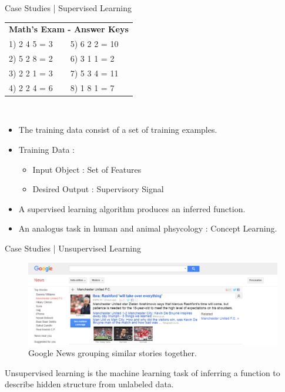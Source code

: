 \documentclass[10pt]{beamer}
\begin{document}
			\begin{frame}{Case Studies | Supervised Learning}
				\begin{center}
					\begin{tabular}{|l l|}\hline 
						\multicolumn{2}{|c|}{\textbf{Math's Exam - Answer Keys}}\\
						1) 2  4  5 = 3 & 5) 6  2  2 = 10 \\ 
						2) 5  2  8 = 2 & 6) 3  1  1 = 2  \\ 
						3) 2  2  1 = 3 & 7) 5  3  4 = 11 \\ 
						4) 2  2  4 = 6 & 8) 1  8  1 = 7  \\ \hline
					\end{tabular}\\
					\bigskip
					\begin{itemize}
						\item The training data consist of a set of training examples.
						\item Training Data :
							\begin{itemize}
								\item Input Object : Set of Features
								\item Desired Output : Supervisory Signal
							\end{itemize}
						\item A supervised learning algorithm produces an inferred function.
						\item An analogus task in human and animal phsycology : Concept Learning.
					\end{itemize}
				\end{center}
			\end{frame}
			\begin{frame}{Case Studies | Unsupervised Learning}
				\begin{center}
					\begin{figure}
					\centering
					\includegraphics[width=\linewidth]{images/unsupl-ex}
					\caption{Google News grouping similar stories together.}
					\end{figure}
					Unsupervised learning is the machine learning task of inferring a function to describe hidden structure from unlabeled data.
				\end{center}
			\end{frame}
\end{document}
